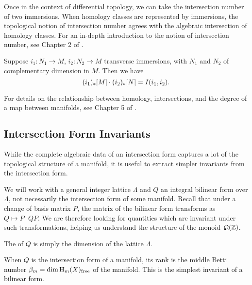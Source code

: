 Once in the context of differential topology, we can take the intersection number of two immersions. When homology classes are represented by immersions, the topological notion of intersection number agrees with the algebraic intersection of homology classes. For an in-depth introduction to the notion of intersection number, see Chapter 2 of \cite{gp2010topology}. 

\begin{theorem}
	Suppose $i_1 : N_1 \to M$, $i_2 : N_2 \to M$ transverse immersions, with $N_1$ and $N_2$ of complementary dimension in $M$. Then we have
	\[(i_1)_*[M]\cdot (i_2)_*[N] = I(i_1,i_2).\]
\end{theorem}

For details on the relationship between homology, intersections, and the degree of a map between manifolds, see Chapter 5 of \cite{hirsch1976differential}.

\subsection{Intersection Form Invariants}\label{sec:intersection-form-invariants}

While the complete algebraic data of an intersection form captures a lot of the topological structure of a manifold, it is useful to extract simpler invariants from the intersection form.

We will work with a general integer lattice $\Lambda$ and $Q$ an integral bilinear form over $\Lambda$, not necessarily the intersection form of some manifold. Recall that under a change of basis matrix $P$, the matrix of the bilinear form transforms as $Q\mapsto P^\intercal QP$. We are therefore looking for quantities which are invariant under such transformations, helping us understand the structure of the monoid $\mathcal{Q}(\mathbb{Z})$.

\begin{definition}
	The  of $Q$ is simply the dimension of the lattice $\Lambda$.
\end{definition}

When $Q$ is the intersection form of a manifold, its rank is the middle Betti number $\beta_m = \dim \operatorname{H}_m(X)_{\textrm{free}}$ of the manifold. This is the simplest invariant of a bilinear form.

